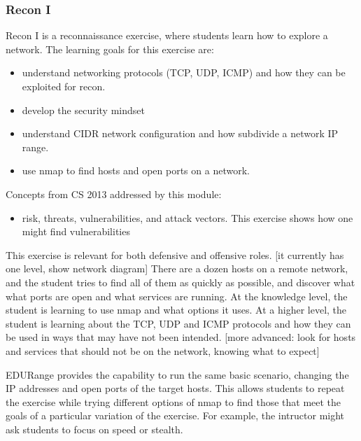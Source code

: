\subsubsection{Recon I}
Recon I  is a reconnaissance exercise, where students learn how to explore a network.
The learning goals for this exercise are:
\begin{itemize}
\item understand networking protocols (TCP, UDP, ICMP) and how they can be exploited for recon.
\item develop the security mindset
\item understand CIDR network configuration and how subdivide a network IP range.
\item use nmap to find hosts and open ports on a network.
\end{itemize}
Concepts from CS 2013 addressed by this module:
\begin{itemize}
\item  risk, threats, vulnerabilities, and attack vectors.  This exercise shows how one might 
  find vulnerabilities
\end{itemize}


This exercise is relevant for both defensive and offensive roles.  
[it currently has one level, show network diagram]
There are a dozen hosts on a remote network, and the student tries to find all of them as quickly as 
possible, and discover what what ports are open and what services are running.  At the knowledge level,
the student is learning to use nmap and what options it uses.  At a higher level, the student is learning
about the TCP, UDP and ICMP protocols and how they can be used in ways that may have not been intended.
[more advanced: look for hosts and services that should not be on the network, knowing what to expect]

EDURange provides the capability to run the same basic scenario, changing the IP addresses and open ports
of the target hosts.  This allows students to repeat the exercise while trying different options of nmap to
find those that meet the goals of a particular variation of the exercise.  For example, the intructor
might ask students to focus on speed or stealth.


